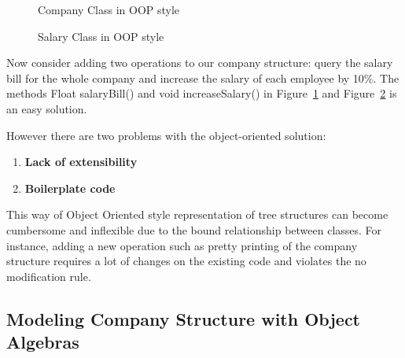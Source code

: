 \begin{figure}[tb]
\vspace{-.1in}
\caption{Company Class in OOP style}
\label{oop_company}
\end{figure}

\begin{figure}[tb]
\vspace{-.1in}
\caption{Salary Class in OOP style}
\label{oop_salary}
\end{figure}

Now consider adding two operations to our company structure: query the
salary bill for the whole company and increase the salary of each
employee by 10\%. The methods Float salaryBill() and void
increaseSalary() in Figure~\ref{oop_company} and
Figure~\ref{oop_salary} is an easy solution.

However there are two problems with the object-oriented solution:

\begin{enumerate}

\item {\bf Lack of extensibility} 

\item {\bf Boilerplate code} 

\end{enumerate}

This way of Object Oriented style representation of tree structures
can become cumbersome and inflexible due to the bound relationship
between classes. For instance, adding a new operation such as pretty
printing of the company structure requires a lot of changes on the
existing code and violates the no modification rule.



\subsection{Modeling Company Structure with Object Algebras}

